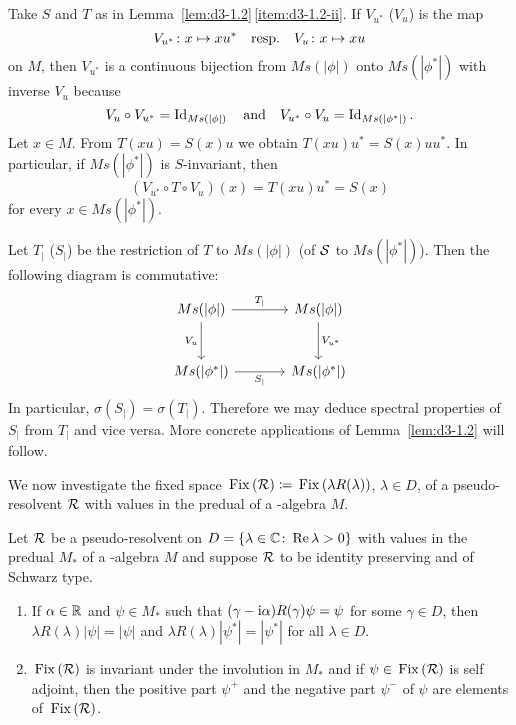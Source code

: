 \begin{remark}\label{rem:d3-1.3}
Take $S$ and $T$ as in Lemma~\ref{lem:d3-1.2}\,\ref{item:d3-1.2-ii}.
If $V_{u^{*}}$ (\resp  $V_{u}$) is the map 
\[
V_{u^{*}} \colon x \mapsto xu^{*}
\quad \text{resp.} \quad
V_{u} \colon x \mapsto xu 
\]
on $M$, then $V_{u^{*}}$ is a continuous bijection from $Ms(|\phi|)$ onto $Ms(|\phi^{*}|)$ with inverse $V_u$ because 
\[
V_{u} \circ V_{u^{*}} = \operatorname{Id}_{Ms(|\phi|)}
\quad \text{and} \quad 
V_{u^{*}} \circ V_{u} = \operatorname{Id}_{Ms(|\phi^{*}|)} .
\]
Let $x \in M$.
From $T(xu) = S(x)u$ we obtain $T(xu)u^{*} = S(x)uu^{*}$.
In particular, if $Ms(|\phi^{*}|)$ is $S$-invariant, then
\[
	(V_{u^{*}} \circ T \circ V_u)(x) = T(xu)u^{*} = S(x)
\]
for every $x \in Ms(|\phi^{*}|)$.

Let $T_{|}$ (\resp  $S_{|}$) be the restriction of $T$ to $Ms(|\phi|)$ (\resp of $\mathcal{S}$ to $Ms(|\phi^{*}|)$).
Then the following diagram is commutative:
\begin{equation*}
\begin{tikzcd}[column sep=large, row sep=large, scale=1.5]
Ms(|\phi|) \arrow[r, "T_{|}"] \arrow[d, "V_u"'] & Ms(|\phi|) \arrow[d, "V_{u^{*}}"] \\
Ms(|\phi^{*}|) \arrow[r, "S_{|}"'] & Ms(|\phi^{*}|)
\end{tikzcd}
\end{equation*}
In particular, $\sigma(S_{|}) = \sigma(T_{|})$.
Therefore we may deduce spectral properties of $S_{|}$ from $T_{|}$ and vice versa.
More concrete applications of Lemma~\ref{lem:d3-1.2} will follow.
\end{remark}
We now investigate the fixed space $\mathop{}\mathrm{Fix}\left(\mathcal{R}\right) \coloneqq \mathop{}\mathrm{Fix}\left(\lambda R(\lambda)\right)$, $\lambda \in D$, of a pseudo-resolvent $\mathcal{R}$ with values in the predual of a \WA-algebra $M$.
\begin{proposition}\label{prop:d3-1.4}
Let $\mathcal{R}$ be a pseudo-resolvent on $D = \{\lambda \in \mathbb{C} \colon \mathop{}\!\mathrm{Re}\,\lambda > 0\}$ with values in the predual $M_{*}$ of a \WA-algebra $M$ and suppose $\mathcal{R}$ to be identity preserving and of Schwarz type.
\begin{enumerate}[\upshape (i)]

\item\label{item:d3-1.4-i}
If $\alpha \in \mathbb{R}$ and $\psi \in M_{*}$ such that $(\gamma - \mathrm{i}\alpha)R(\gamma)\psi = \psi$ for some $\gamma \in D$, then $\lambda R(\lambda)|\psi| = |\psi|$ and $\lambda R(\lambda)|\psi^{*}| = |\psi^{*}|$ for all $\lambda \in D$.

\item\label{item:d3-1.4-ii} 
$ \mathop{}\mathrm{Fix}\left(\mathcal{R}\right) $ is invariant under the involution in $M_{*}$ and if $\psi \in \mathop{}\mathrm{Fix}\left(\mathcal{R}\right) $ is self adjoint, then the positive part $\psi^{+}$ and the negative part $\psi^{-}$ of $\psi$ are elements of $ \mathop{}\mathrm{Fix}\left(\mathcal{R}\right) $.
\end{enumerate}
\end{proposition}

